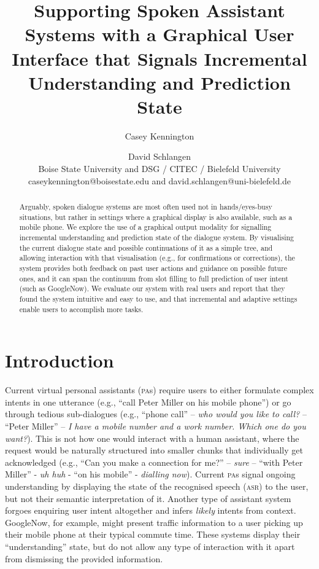 \documentclass[11pt]{article}
\title{Supporting Spoken Assistant Systems with a Graphical User\\ Interface that Signals Incremental Understanding and Prediction State}
\author{Casey Kennington \and David Schlangen\\Boise State University and DSG / CITEC / Bielefeld University \\caseykennington@boisestate.edu and david.schlangen@uni-bielefeld.de}
\newcommand{\asr}[0]{\textsc{asr}}
\newcommand{\pa}[0]{\textsc{pa}}
\begin{document}

\maketitle

\begin{abstract}
Arguably, spoken dialogue systems are most often used not in hands/eyes-busy situations, but rather in settings where a graphical display is also available, such as a mobile phone. We explore the use of a graphical output modality for signalling incremental understanding and prediction state of the dialogue system. By visualising the current dialogue state and possible continuations of it as a simple tree, and allowing interaction with that visualisation (e.g., for confirmations or corrections), the system provides both feedback on past user actions and guidance on possible future ones, and it can span the continuum from slot filling to full prediction of user intent (such as GoogleNow). We evaluate our system with real users and report that they found the system intuitive and easy to use, and that incremental and adaptive settings enable users to accomplish more tasks.
\end{abstract}

\section{Introduction}
\label{section:intro}

Current virtual personal assistants (\pa s) require users to either formulate complex intents in one utterance (e.g., ``call Peter Miller on his mobile phone'') or go through tedious sub-dialogues (e.g., ``phone call'' -- \emph{who would you like to call?} -- ``Peter Miller'' -- \emph{I have a mobile number and a work number. Which one do you want?}). This is not how one would interact with a human assistant, where the request would be naturally structured into smaller chunks that individually get acknowledged (e.g., ``Can you make a connection for me?'' -- \emph{sure} -- ``with Peter Miller'' - \emph{uh huh} - ``on his mobile'' - \emph{dialling now}). Current \pa s signal ongoing understanding by displaying the state of the recognised speech (\asr) to the user, but not their semantic interpretation of it. Another type of assistant system forgoes enquiring user intent altogether and infers \emph{likely} intents from context. GoogleNow, for example, might present traffic information to a user picking up their mobile phone at their typical commute time. These systems display their ``understanding'' state, but do not allow any type of interaction with it apart from dismissing the provided information.
\end{document}
